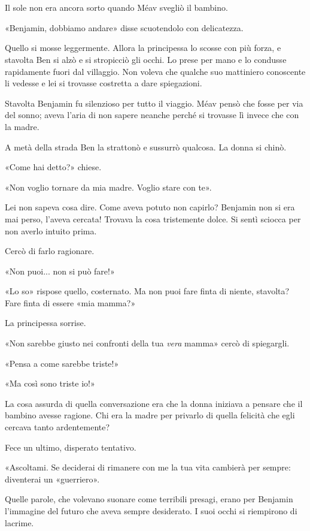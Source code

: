 \chapter{}
\label{ch:4}

Il sole non era ancora sorto quando Méav svegliò il bambino.

«Benjamin, dobbiamo andare» disse scuotendolo con delicatezza.

Quello si mosse leggermente. Allora la principessa lo scosse con più forza, e stavolta Ben si alzò e
si stropicciò gli occhi. Lo prese per mano e lo condusse rapidamente fuori dal villaggio. Non voleva
che qualche suo mattiniero conoscente li vedesse e lei si trovasse costretta a dare spiegazioni.

Stavolta Benjamin fu silenzioso per tutto il viaggio. Méav pensò che fosse per via del sonno; aveva
l'aria di non sapere neanche perché si trovasse lì invece che con la madre.

A metà della strada Ben la strattonò e sussurrò qualcosa. La donna si chinò.

«Come hai detto?» chiese.

«Non voglio tornare da mia madre. Voglio stare con te».

Lei non sapeva cosa dire. Come aveva potuto non capirlo? Benjamin non si era mai perso, l'aveva
cercata! Trovava la cosa tristemente dolce. Si sentì sciocca per non averlo intuito prima.

Cercò di farlo ragionare.

«Non puoi... non si può fare!»

«Lo so» rispose quello, costernato. Ma non puoi fare finta di niente, stavolta? Fare finta di essere
«mia mamma?»

La principessa sorrise.

«Non sarebbe giusto nei confronti della tua \emph{vera} mamma» cercò di spiegargli.

«Pensa a come sarebbe triste!»

«Ma così sono triste io!»

La cosa assurda di quella conversazione era che la donna iniziava a pensare che il bambino avesse
ragione. Chi era la madre per privarlo di quella felicità che egli cercava tanto ardentemente?

Fece un ultimo, disperato tentativo.

«Ascoltami. Se deciderai di rimanere con me la tua vita cambierà per sempre: diventerai un
«guerriero».

Quelle parole, che volevano suonare come terribili presagi, erano per Benjamin l'immagine del futuro
che aveva sempre desiderato. I suoi occhi si riempirono di lacrime.

